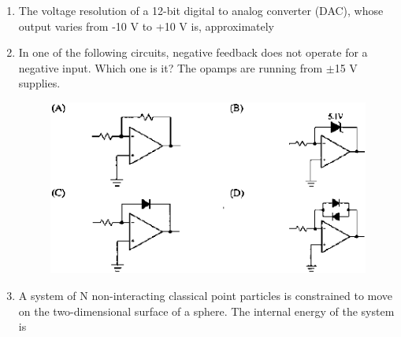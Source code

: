 \documentclass[journal,12pt,onecolumn]{IEEEtran}
\theoremstyle{remark}
\begin{document}
\begin{enumerate}
\item The voltage resolution of a 12-bit digital to analog converter (DAC), whose output varies from -10 V to +10 V is, approximately\hfill{}

\begin{enumerate}  \end{enumerate}

\item In one of the following circuits, negative feedback does not operate for a negative input. Which one is it? The opamps are running from $\pm$15 V supplies.\hfill{}
\begin{figure}[H]
	\centering
	\caption*{} \label{20} \includegraphics[width=0.9\columnwidth]{figs/20.png}
\end{figure}

\item A system of N non-interacting classical point particles is constrained to move on the two-dimensional surface of a sphere. The internal energy of the system is\hfill{}

\begin{enumerate}  \end{enumerate}


\end{enumerate}
\end{document}
